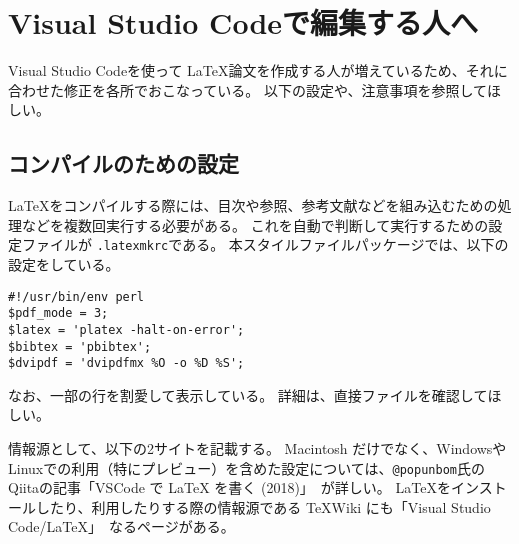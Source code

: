 \documentclass[a4paper,11pt,oneside,openany]{jsbook}
\begin{document}
\chapter{Visual Studio Codeで編集する人へ}
Visual Studio Codeを使って \LaTeX 論文を作成する人が増えているため、それに合わせた修正を各所でおこなっている。
以下の設定や、注意事項を参照してほしい。

\section{コンパイルのための設定}
\LaTeX をコンパイルする際には、目次や参照、参考文献などを組み込むための処理などを複数回実行する必要がある。
これを自動で判断して実行するための設定ファイルが \verb+.latexmkrc+である。
本スタイルファイルパッケージでは、以下の設定をしている。
\begin{screen}
{\small
\begin{verbatim}
#!/usr/bin/env perl
$pdf_mode = 3;
$latex = 'platex -halt-on-error';
$bibtex = 'pbibtex';
$dvipdf = 'dvipdfmx %O -o %D %S';
\end{verbatim}    
}
\end{screen}

なお、一部の行を割愛して表示している。
詳細は、直接ファイルを確認してほしい。

情報源として、以下の2サイトを記載する。
Macintosh だけでなく、WindowsやLinuxでの利用（特にプレビュー）を含めた設定については、\verb+@popunbom+氏のQiitaの記事「VSCode で LaTeX を書く (2018)」~\cite{popunbom1}が詳しい。
LaTeXをインストールしたり、利用したりする際の情報源である \TeX Wiki にも「Visual Studio Code/LaTeX」~\cite{texwikivscode}なるページがある。
\end{document}
